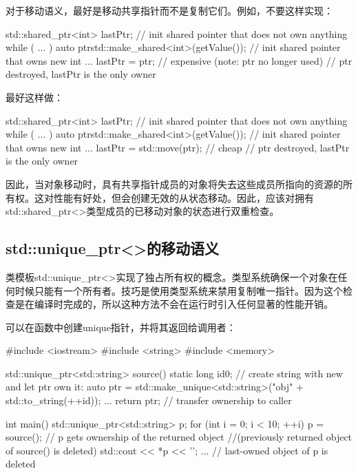 对于移动语义，最好是移动共享指针而不是复制它们。例如，不要这样实现：

\begin{cppcode}
std::shared_ptr<int> lastPtr; // init shared pointer that does not own anything
while ( ... ) {
	auto ptr{std::make_shared<int>(getValue())}; // init shared pointer that owns new int
	...
	lastPtr = ptr; // expensive (note: ptr no longer used)
} // ptr destroyed, lastPtr is the only owner
\end{cppcode}

最好这样做：

\begin{cppcode}
std::shared_ptr<int> lastPtr; // init shared pointer that does not own anything
while ( ... ) {
	auto ptr{std::make_shared<int>(getValue())}; // init shared pointer that owns new int
	...
	lastPtr = std::move(ptr); // cheap
} // ptr destroyed, lastPtr is the only owner
\end{cppcode}

因此，当对象移动时，具有共享指针成员的对象将失去这些成员所指向的资源的所有权。这对性能有好处，但会创建无效的从状态移动。因此，应该对拥有std::shared_ptr<>类型成员的已移动对象的状态进行双重检查。

\subsection{std::unique_ptr<>的移动语义}

类模板std::unique_ptr<>实现了独占所有权的概念。类型系统确保一个对象在任何时候只能有一个所有者。技巧是使用类型系统来禁用复制唯一指针。因为这个检查是在编译时完成的，所以这种方法不会在运行时引入任何显著的性能开销。

可以在函数中创建unique指针，并将其返回给调用者：

\begin{cppcode}
#include <iostream>
#include <string>
#include <memory>

std::unique_ptr<std::string> source()
{
	static long id{0};
	// create string with new and let ptr own it:
	auto ptr = std::make_unique<std::string>("obj" + std::to_string(++id));
	...
	return ptr; // transfer ownership to caller
}

int main()
{
	std::unique_ptr<std::string> p;
	for (int i = 0; i < 10; ++i) {
		p = source(); // p gets ownership of the returned object
		              //(previously returned object of source() is deleted)
		std::cout << *p << '\n';
		...
	}
} // last-owned object of p is deleted
\end{cppcode}

